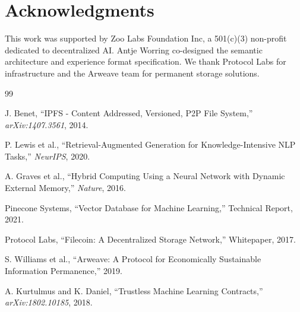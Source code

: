 \section*{Acknowledgments}


This work was supported by Zoo Labs Foundation Inc, a 501(c)(3) non-profit dedicated to decentralized AI. Antje Worring co-designed the semantic architecture and experience format specification. We thank Protocol Labs for \IPFS{} infrastructure and the Arweave team for permanent storage solutions.


\begin{thebibliography}{99}

J. Benet, ``IPFS - Content Addressed, Versioned, P2P File System,'' \textit{arXiv:1407.3561}, 2014.

P. Lewis et al., ``Retrieval-Augmented Generation for Knowledge-Intensive NLP Tasks,'' \textit{NeurIPS}, 2020.

A. Graves et al., ``Hybrid Computing Using a Neural Network with Dynamic External Memory,'' \textit{Nature}, 2016.

Pinecone Systems, ``Vector Database for Machine Learning,'' Technical Report, 2021.

Protocol Labs, ``Filecoin: A Decentralized Storage Network,'' Whitepaper, 2017.

S. Williams et al., ``Arweave: A Protocol for Economically Sustainable Information Permanence,'' 2019.

A. Kurtulmus and K. Daniel, ``Trustless Machine Learning Contracts,'' \textit{arXiv:1802.10185}, 2018.

\end{thebibliography}

\appendix

